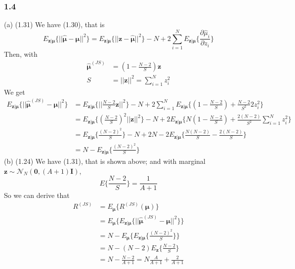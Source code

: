 \documentclass{article}
\begin{document}
\subsubsection*{1.4}
(a) (1.31) \newline
We have (1.30), that is
\begin{displaymath}
E_{\bm{z|\mu}} \{||\hat{\bm{\mu}} - \bm{\mu}||^2\} 
= E_{\bm{z|\mu}} \{||\bm{z} - \hat{\bm{\mu}}||^2\} - N 
+ 2\sum_{i=1}^N E_{\bm{z|\mu}}\{\frac{\partial \hat{\mu}_i}{\partial z_i}\}
\end{displaymath}
Then, with 
\begin{displaymath}
\begin{split}
\hat{\bm{\mu}}^{(JS)} &= (1 - \frac{N-2}{S}) \bm{z} \\
S &=||\bm{z}||^2= \sum_{i=1}^N z_i^2
\end{split}
\end{displaymath}
We get
\begin{displaymath}
\begin{split}
E_{\bm{z|\mu}} \{||\hat{\bm{\mu}}^{(JS)} - \bm{\mu}||^2\} 
& =  E_{\bm{z|\mu}} \{||\frac{N-2}{S} \bm{z}||^2\} - N + 2\sum_{i=1}^N
E_{\bm{z|\mu}} \{(1-\frac{N-2}{S}) + \frac{N-2}{S^2} 2z_i^2 \}  \\
& = E_{\bm{z|\mu}} \{(\frac{N-2}{S})^2 ||\bm{z}||^2\} - N + 
2 E_{\bm{z|\mu}} \{N(1-\frac{N-2}{S}) + \frac{2(N-2)}{S^2} \sum_{i=1}^N z_i^2\} \\
& = E_{\bm{z|\mu}} \{\frac{(N-2)^2}{S} \} - N + 2N -
2 E_{\bm{z|\mu}} \{\frac{N(N-2)}{S} - \frac{2(N-2)}{S} \} \\
& = N - E_{\bm{z|\mu}} \{\frac{(N-2)^2}{S} \}
\end{split}
\end{displaymath}
(b) (1.24) \newline
We have (1.31), that is shown above; and with marginal 
$\bm{z} \sim \mathcal{N}_N(\bm{0},(A+1)\bm{I})$, 
\begin{displaymath}
E\{ \frac{N-2}{S} \} = \frac{1}{A+1}
\end{displaymath}
So we can derive that
\begin{displaymath}
\begin{split}
R^{(JS)} & = E_{\bm{\mu}} \{ R^{(JS)} (\bm{\mu}) \} \\
& = E_{\bm{\mu}} \{ E_{\bm{z|\mu}} \{||\hat{\bm{\mu}}^{(JS)} - \bm{\mu}||^2\} \} \\
& = N - E_{\bm{\mu}} \{ E_{\bm{z|\mu}} \{ \frac{(N-2)^2}{S} \} \} \\
& = N - (N-2) E_{\bm{z}} \{ \frac{N-2}{S} \} \\
& = N - \frac{N-2}{A+1}  = N \frac{A}{A+1} + \frac{2}{A+1}
\end{split}
\end{displaymath}
\end{document}
